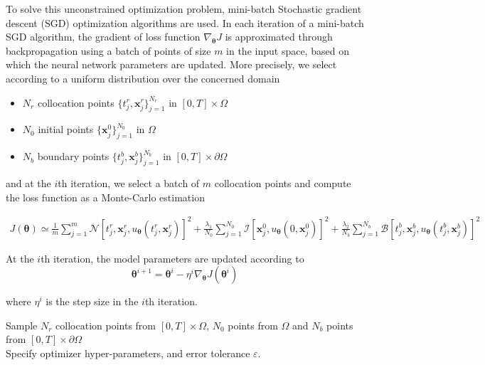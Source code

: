 \documentclass[12pt,openany]{amsbook}
\newcommand{\bbm}[1]{{\mathbf{#1}}}
\begin{document}
To solve this unconstrained optimization problem, mini-batch Stochastic gradient descent (SGD) optimization algorithms
are used. In each iteration of a mini-batch SGD algorithm, the gradient of loss function $\nabla_{\bm \theta} J$ is
approximated through backpropagation using a batch of points of size $m$ in the input space, based
on which the neural network parameters are updated. 
More precisely,
we select according to a uniform distribution over the concerned domain \\

\begin{itemize}
    \item[1.] $N_r$ collocation points $\{t_j^r, \bbm x_j^r\}_{j=1}^{N_r}$ in $[0,T]\times\Omega$
    \item[2.] $N_0$ initial points $\{\bbm x_j^0\}_{j=1}^{N_0}$ in $\Omega$
    \item[3.] $N_b$ boundary points $\{t_j^b, \bbm x_j^b\}_{j=1}^{N_b}$ in $[0,T]\times\partial\Omega$
\end{itemize}
and at the $i$th iteration, we select a batch of $m$ collocation points and compute the loss function as a Monte-Carlo estimation 

\begin{align}
    J(\bm \theta) \simeq \frac{1}{m} \sum_{j=1}^{m} \mathcal{N}[t_j^r,\bbm x_j^r, u_{\bm \theta}(t_j^r,\bbm x_j^r)]^2
    + \frac{\lambda_1}{N_0} \sum_{j=1}^{N_0} \mathcal{I}[\bbm x_j^0, u_{\bm \theta}(0, \bbm x_j^0)]^2  
    + \frac{\lambda_2}{N_b} \sum_{j=1}^{N_b} \mathcal{B}[t_j^b,\bbm x_j^b, u_{\bm \theta}(t_j^b,\bbm x_j^b)]^2 
    \label{eq:LOSS}
\end{align}

At the $i$th iteration, the model parameters are updated according to
\begin{equation}
\bm \theta^{i+1} = \bm \theta^i - \eta^i \nabla_{\bm \theta}J(\bm \theta^i)
\label{eq:gradientstep}
\end{equation}

where $\eta^i$ is the step size in the $i$th iteration.\\

\begin{algorithm}[H]
    Sample $N_r$ collocation points from $[0,T]\times\Omega$, 
    $N_0$ points from $\Omega$ and $N_b$ points from $[0,T]\times\partial\Omega$\\
    Specify optimizer hyper-parameters, and error tolerance $\varepsilon$.\\
    \caption{PINNs training}
    \label{algo:1}
\end{algorithm}
\end{document}
